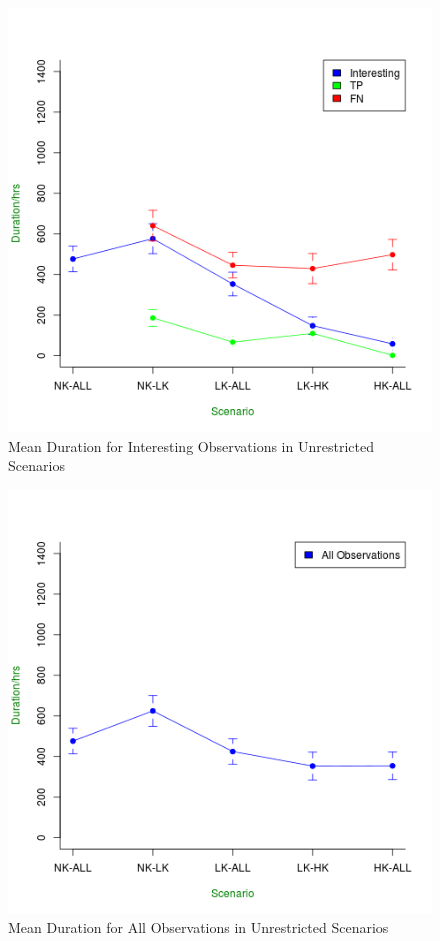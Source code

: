 \begin{figure}[!h]
\centering
\includegraphics[width=\textwidth]{Chap7/figures/unres_all_int.png}
\caption{Mean Duration for Interesting Observations in Unrestricted Scenarios}
\label{fig:unres_int}
\end{figure}

\begin{figure}[!h]
\centering
\includegraphics[width=\textwidth]{Chap7/figures/unres_all_total.png}
\caption{Mean Duration for All Observations in Unrestricted Scenarios}
\label{fig:unres_total}
\end{figure}

